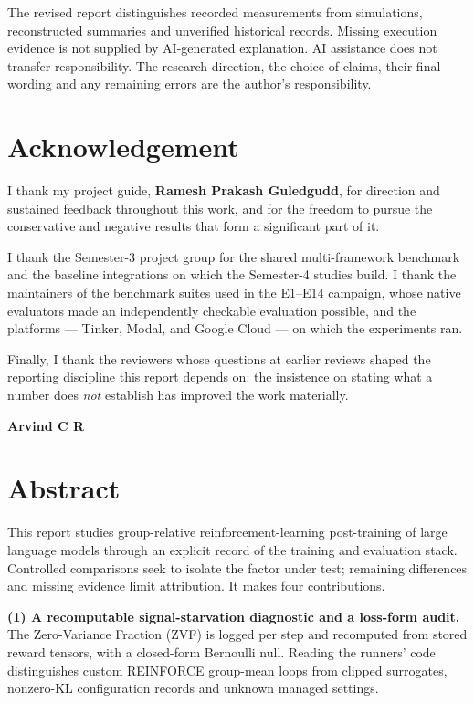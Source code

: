 The revised report distinguishes recorded measurements from simulations, reconstructed summaries and unverified historical records. Missing execution evidence is not supplied by AI-generated explanation. AI assistance does not transfer responsibility.
The research direction, the choice of claims, their final wording and any
remaining errors are the author's responsibility.

\chapter*{Acknowledgement}
\thispagestyle{plain}

I thank my project guide, \textbf{Ramesh Prakash Guledgudd}, for direction and
sustained feedback throughout this work, and for the freedom to pursue the
conservative and negative results that form a significant part of it.

I thank the Semester-3 project group for the shared multi-framework benchmark
and the baseline integrations on which the Semester-4 studies build. I thank
the maintainers of the benchmark suites used in the E1--E14 campaign, whose
native evaluators made an independently checkable evaluation possible, and the
platforms --- Tinker, Modal, and Google Cloud --- on which the experiments ran.

Finally, I thank the reviewers whose questions at earlier reviews shaped the
reporting discipline this report depends on: the insistence on stating what a
number does \emph{not} establish has improved the work materially.

\vspace{0.3in}
\noindent\textbf{Arvind C R}

\chapter*{Abstract}
\thispagestyle{plain}

This report studies group-relative reinforcement-learning post-training of
large language models through an explicit record of the training and
evaluation stack. Controlled comparisons seek to isolate the factor under
test; remaining differences and missing evidence limit attribution.
It makes four contributions.

\textbf{(1) A recomputable signal-starvation diagnostic and a loss-form
audit.} The Zero-Variance Fraction (ZVF) is logged per step and recomputed
from stored reward tensors, with a closed-form Bernoulli null. Reading the
runners' code distinguishes custom REINFORCE group-mean loops from clipped
surrogates, nonzero-KL configuration records and unknown managed settings.

